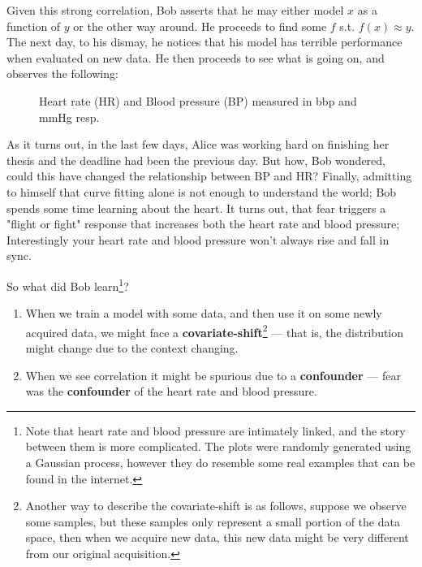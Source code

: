 Given this strong correlation, Bob asserts that he may either model $x$ as a function of $y$ or the other way 
around. He proceeds to find some $f$ s.t. $f(x) \approx y$. The next day, to his dismay, he notices that his
model has terrible performance when evaluated on new data. He then proceeds to see what is going on, and 
observes the following:

\begin{figure}[htb]
    \centering
    \caption{Heart rate (HR) and Blood pressure (BP) measured in bbp and mmHg resp.}
\end{figure}

As it turns out, in the last few days, Alice was working hard on finishing her thesis and the deadline had been 
the previous day. But how, Bob wondered, could this have changed the relationship between BP and HR? 
Finally, admitting to himself that curve fitting alone is not enough to understand the world; 
Bob spends some time learning about the heart. It turns out, that fear triggers a "flight or fight"
response that increases both the heart rate and blood pressure; Interestingly your heart rate and blood pressure 
won’t always rise and fall in sync.

So what did Bob learn\footnote{
    Note that heart rate and blood pressure are intimately linked, and the story between them is more complicated.
    The plots were randomly generated using a Gaussian process, however they do resemble some real examples that 
    can be found in the internet.
}?

\begin{enumerate}
    \item When we train a model with some data, and then use it on some newly acquired data, we might
    face a \textbf{covariate-shift}\footnote{Another way to describe the covariate-shift is as follows, 
    suppose we observe some samples, but
    these samples only represent a small portion of the data space, then when we acquire new data, this new data might be very 
    different from our original acquisition. } --- that is, the distribution might change due to the context changing.
    \item When we see correlation it might be spurious due to a \textbf{confounder} --- fear was the \textbf{confounder} 
    of the heart rate and blood pressure.
\end{enumerate}

